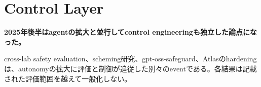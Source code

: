 \section{Control Layer}
\noindent\textbf{2025年後半はagentの拡大と並行してcontrol engineeringも独立した論点になった。}\autocite{src-ad13fe7d3321}

cross-lab safety evaluation、scheming研究、gpt-oss-safeguard、Atlasのhardeningは、autonomyの拡大に評価と制御が追従した別々のeventである。各結果は記載された評価範囲を越えて一般化しない。\autocite{src-0ad9fbef8c87,src-2081c76ea2b4,src-240a05c02f85,src-3556c47e80db,src-ad13fe7d3321,src-bef6cbe2a83e}
